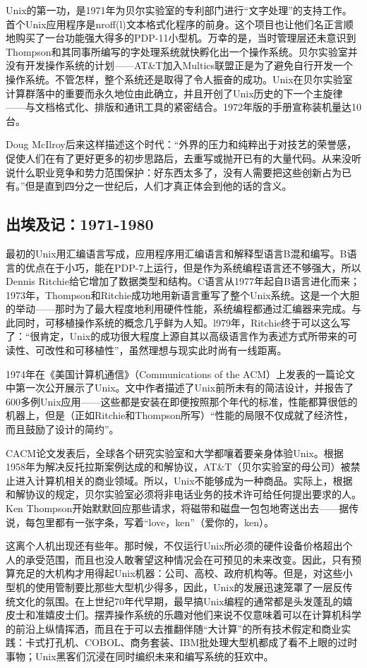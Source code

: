 \documentclass[12pt,oneside]{book}
\begin{document}
\begin{common-format}
Unix的第一功，是1971年为贝尔实验室的专利部门进行“文字处理”的支持工作。首个Unix应用程序是nroff(l)文本格式化程序的前身。这个项目也让他们名正言顺地购买了一台功能强大得多的PDP-11小型机。万幸的是，当时管理层还未意识到Thompson和其同事所编写的字处理系统就快孵化出一个操作系统。贝尔实验室并没有开发操作系统的计划——AT\&{}T加入Multics联盟正是为了避免自行开发一个操作系统。不管怎样，整个系统还是取得了令人振奋的成功。Unix在贝尔实验室计算群落中的重要而永久地位由此确立，并且开创了Unix历史的下一个主旋律——与文档格式化、排版和通讯工具的紧密结合。1972年版的手册宣称装机量达10台。

Doug McIlroy\cite{McIlroy91}后来这样描述这个时代：“外界的压力和纯粹出于对技艺的荣誉感，促使人们在有了更好更多的初步思路后，去重写或抛开已有的大量代码。从来没听说什么职业竞争和势力范围保护：好东西太多了，没有人需要把这些创新占为已有。”但是直到四分之一世纪后，人们才真正体会到他的话的含义。


\subsection{出埃及记：1971-1980}
最初的Unix用汇编语言写成，应用程序用汇编语言和解释型语言B混和编写。B语言的优点在于小巧，能在PDP-7上运行，但是作为系统编程语言还不够强大，所以Dennis Ritchie给它增加了数据类型和结构。C语言从1977年起自B语言进化而来；1973年，Thompson和Ritchie成功地用新语言重写了整个Unix系统。这是一个大胆的举动——那时为了最大程度地利用硬件性能，系统编程都通过汇编器来完成。与此同时，可移植操作系统的概念几乎鲜为人知。l979年，Ritchie终于可以这么写了：“很肯定，Unix的成功很大程度上源自其以高级语言作为表述方式所带来的可读性、可改性和可移植性”，虽然理想与现实此时尚有一线距离。

1974年在《美国计算机通信》（Communications of the ACM）上发表的一篇论文中\cite{Ritchie-Thompson}第一次公开展示了Unix。文中作者描述了Unix前所未有的简洁设计，并报告了600多例Unix应用——这些都是安装在即便按照那个年代的标准，性能都算很低的机器上，但是（正如Ritchie和Thompson所写）“性能的局限不仅成就了经济性，而且鼓励了设计的简约”。

CACM论文发表后，全球各个研究实验室和大学都嚷着要亲身体验Unix。根据1958年为解决反托拉斯案例达成的和解协议，AT\&{}T（贝尔实验室的母公司）被禁止进入计算机相关的商业领域。所以，Unix不能够成为一种商品。实际上，根据和解协议的规定，贝尔实验室必须将非电话业务的技术许可给任何提出要求的人。Ken Thompson开始默默回应那些请求，将磁带和磁盘一包包地寄送出去——据传说，每包里都有一张字条，写着“love，ken”（爱你的，ken）。

这离个人机出现还有些年。那时候，不仅运行Unix所必须的硬件设备价格超出个人的承受范围，而且也没人敢奢望这种情况会在可预见的未来改变。因此，只有预算充足的大机构才用得起Unix机器：公司、高校、政府机构等。但是，对这些小型机的使用管制要比那些大型机少得多，因此，Unix的发展迅速笼罩了一层反传统文化的氛围。在上世纪70年代早期，最早搞Unix编程的通常都是头发蓬乱的嬉皮士和准嬉皮士们。摆弄操作系统的乐趣对他们来说不仅意味着可以在计算机科学的前沿上纵情挥洒，而且在于可以去推翻伴随“大计算”的所有技术假定和商业实践：卡式打孔机、COBOL、商务套装、IBM批处理大型机都成了看不上眼的过时事物；Unix黑客们沉浸在同时编织未来和编写系统的狂欢中。


\end{common-format}
\end{document}
